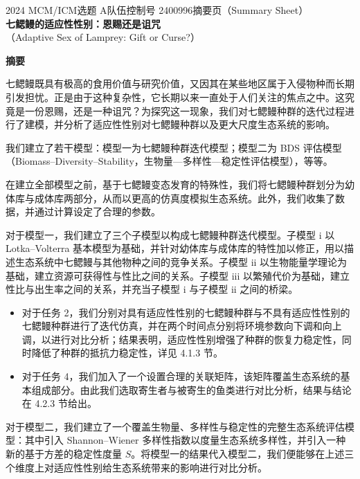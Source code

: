 \documentclass[11pt,a4paper]{ctexart}
\begin{document}
\thispagestyle{empty}
\begin{center}
{\small 2024 MCM/ICM\quad 选题 A\quad 队伍控制号 2400996\quad 摘要页（Summary Sheet）}\\[18pt]
{\LARGE\bfseries 七鳃鳗的适应性性别：恩赐还是诅咒}\\[8pt]
{\large （Adaptive Sex of Lamprey: Gift or Curse?）}\\[10pt]
\end{center}

\begin{center}
{\large\bfseries 摘\quad 要}
\end{center}

\vspace{6pt}
七鳃鳗既具有极高的食用价值与研究价值，又因其在某些地区属于入侵物种而长期引发担忧。正是由于这种复杂性，它长期以来一直处于人们关注的焦点之中。这究竟是一份恩赐，还是一种诅咒？为探究这一现象，我们对七鳃鳗种群的迭代过程进行了建模，并分析了适应性性别对七鳃鳗种群以及更大尺度生态系统的影响。

我们建立了若干模型：模型一为七鳃鳗种群迭代模型；模型二为 BDS 评估模型（Biomass--Diversity--Stability，生物量—多样性—稳定性评估模型），等等。

在建立全部模型之前，基于七鳃鳗变态发育的特殊性，我们将七鳃鳗种群划分为幼体库与成体库两部分，从而以更高的仿真度模拟生态系统。此外，我们收集了数据，并通过计算设定了合理的参数。

对于模型一，我们建立了三个子模型以构成七鳃鳗种群迭代模型。子模型 i 以 Lotka--Volterra 基本模型为基础，并针对幼体库与成体库的特性加以修正，用以描述生态系统中七鳃鳗与其他物种之间的竞争关系。子模型 ii 以生物能量学理论为基础，建立资源可获得性与性比之间的关系。子模型 iii 以繁殖代价为基础，建立性比与出生率之间的关系，并充当子模型 i 与子模型 ii 之间的桥梁。

\begin{itemize}
\item 对于任务 2，我们分别对具有适应性性别的七鳃鳗种群与不具有适应性性别的七鳃鳗种群进行了迭代仿真，并在两个时间点分别将环境参数向下调和向上调，以进行对比分析；结果表明，适应性性别增强了种群的恢复力稳定性，同时降低了种群的抵抗力稳定性，详见 4.1.3 节。
\item 对于任务 4，我们加入了一个设置合理的关联矩阵，该矩阵覆盖生态系统的基本组成部分。由此我们选取寄生者与被寄生的鱼类进行对比分析，结果与结论在 4.2.3 节给出。
\end{itemize}

对于模型二，我们建立了一个覆盖生物量、多样性与稳定性的完整生态系统评估模型：其中引入 Shannon--Wiener 多样性指数以度量生态系统多样性，并引入一种新的基于方差的稳定性度量 $S$。将模型一的结果代入模型二，我们便能够在上述三个维度上对适应性性别给生态系统带来的影响进行对比分析。
\end{document}
